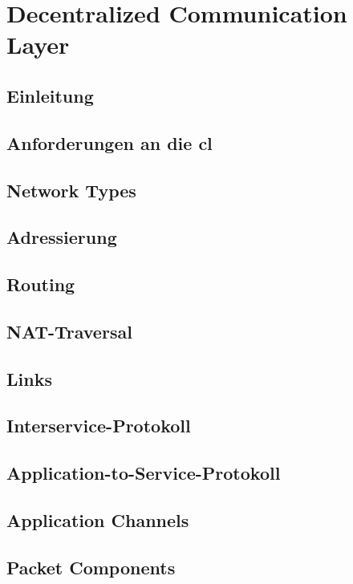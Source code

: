\chapter{Decentralized Communication Layer}\label{DCL}
\renewcommand{\kapitelautor}{Autor: Martin Exner}

\section{Einleitung}


\section{Anforderungen an die \gls*{cl}}


\section{Network Types}


\section{Adressierung}


\section{Routing}


\section{NAT-Traversal}


\section{Links}


\section{Interservice-Protokoll}


\section{Application-to-Service-Protokoll}


\section{Application Channels}


\section{Packet Components}

